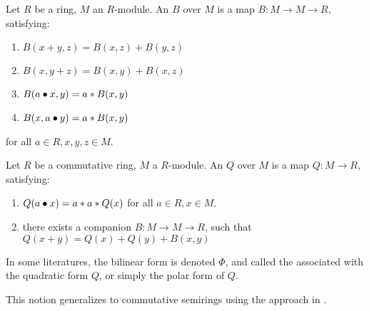 \begin{definition}
    \label{BilinForm}
    \leanok

    Let $R$ be a ring, $M$ an $R$-module. An  $B$ over $M$ is a map $B : M \to M \to R$, satisfying:

    \begin{enumerate}

    \item $ B(x + y, z) = B(x, z) +B(y, z) $
    
    \item $ B(x, y + z) = B(x, y) +B(x, z) $
    
    \item $ B(a \bullet x, y) = a * B(x, y)$
    
    \item $ B(x, a \bullet y) = a * B(x, y)$
        
    \end{enumerate}

    for all $a \in R, x, y, z \in M$.

\end{definition}

\begin{definition}
    \label{QuadraticForm}
    \leanok

    Let $R$ be a commutative ring, $M$ a $R$-module. An  $Q$ over $M$ is a map $Q : M \to R$, satisfying:

    \begin{enumerate}

    \item $ Q(a \bullet x) = a * a * Q(x)$ for all $a \in R, x \in M$.
    
    \item there exists a companion  $B : M \to M \to R$, such that $Q(x + y) = Q(x) + Q(y) + B(x, y)$
    
    \end{enumerate}

    In some literatures, the bilinear form is denoted $\Phi$, and called the  associated with the quadratic form $Q$,
    or simply the polar form of $Q$.

\end{definition}

\begin{remark}
    \label{mk:QuadraticForm}

    This notion generalizes to commutative semirings using the approach in \cite{izhakian2016}.
    
\end{remark}